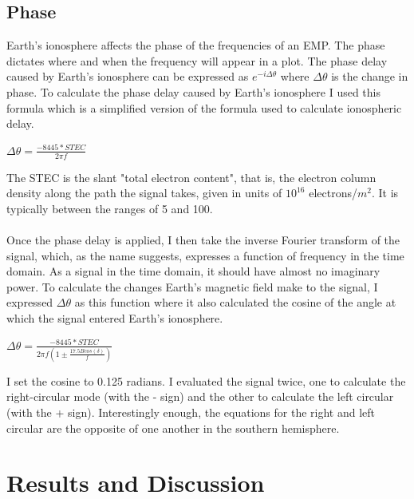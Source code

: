 \documentclass[12pt, reqno]{amsart}
\begin{document}
\subsection{Phase}
\noindent Earth's ionosphere affects the phase of the frequencies of an EMP. The phase dictates where and when the frequency will appear in a plot. The phase delay caused by Earth's ionosphere can be expressed as $e^{-i \Delta \theta}$ where $\Delta\theta$ is the change in phase. To calculate the phase delay caused by Earth's ionosphere I used this formula which is a simplified version of the formula used to calculate ionospheric delay.

\begin{center}
    \large$\Delta \theta = \frac{-8445 *STEC}{2\pi f}$
\end{center}

\noindent The STEC is the slant "total electron content", that is, the electron column density along the path the signal takes, given in units of $10^{16}$ electrons/$m^2$. It is typically between the ranges of 5 and 100.
\\
\\
\noindent Once the phase delay is applied, I then take the inverse Fourier transform of the signal, which, as the name suggests, expresses a function of frequency in the time domain.
As a signal in the time domain, it should have almost no imaginary power. To calculate the changes Earth's magnetic field make to the signal, I expressed $\Delta \theta$ as this function where it also calculated the cosine of the angle at which the signal entered Earth's ionosphere.

\begin{center}
   \Large $\Delta\theta= \frac{-8445*STEC}{2\pi f (1 \pm \frac{17.5Bcos(\delta)}{f})}$
\end{center}

\noindent I set the cosine to 0.125 radians. I evaluated the signal twice, one to calculate the right-circular mode (with the - sign) and the other to calculate the left circular (with the + sign).
Interestingly enough, the equations for the right and left circular are the opposite of one another in the southern hemisphere.


\section{Results and Discussion}
\end{document}
